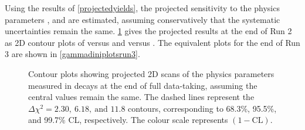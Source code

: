 
Using the results of \tab\ref{projectedyields}, the projected sensitivity to the physics parameters \rb, \deltab and \Pgamma are estimated, assuming conservatively that the systematic uncertainties remain the same. \Fig\ref{gammadiniplotsrun2} gives the projected results at the end of Run 2 as 2D contour plots of \rb versus \Pgamma and \deltab versus \Pgamma. The equivalent plots for the end of Run 3 are shown in \fig\ref{gammadiniplotsrun3}. 

\begin{figure}[h]
\centering
{}
\caption{Contour plots showing projected 2D scans of the physics parameters measured in \btodkst decays at the end of full \runtwo data-taking, assuming the central values remain the same. The dashed lines represent the $\Delta \chi^2 = 2.30,\ 6.18,\ \text{and } 11.8$ contours, corresponding to 68.3\%, 95.5\%, and 99.7\% CL, respectively. The colour scale represents $(1 - \text{CL})$.}
\label{gammadiniplotsrun2}
\end{figure}

